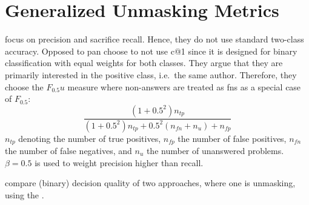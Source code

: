 \section{Generalized Unmasking Metrics}
\label{sec:generalized_unmasking_metrics}

\citet{bevendorff_generalizing_2019} focus on precision and sacrifice recall.
Hence, they do not use standard two-class accuracy.
Opposed to \ac{pan} \citet{bevendorff_generalizing_2019} choose to not use c@1 since it is designed for 
binary classification with equal weights for both classes.
They argue that they are primarily interested in the positive class, i.e.\ the same author.
Therefore, they choose the $F_0.5u$ measure where non-answers are treated as \acp{fn} as a special case of $F_{0.5}$:
$$\frac{(1+0.5^2)n_{tp}}{(1+0.5^2)n_{tp}+0.5^2(n_{fn}+n_{u})+n_{fp}}$$
$n_{tp}$ denoting the number of true positives, $n_{fp}$ the number of false positives, 
$n_{fn}$ the number of false negatives, and $n_{u}$ the number of unanswered problems.
$\beta=0.5$ is used to weight precision higher than recall.


\citet{bevendorff_bias_2019} compare (binary) decision quality of two approaches, where one is unmasking, 
using the .